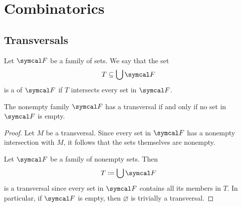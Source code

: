 \section{Combinatorics}\label{sec:combinatorics}
\subsection{Transversals}\label{subsec:transversals}

\begin{definition}\label{def:set_transversal}\cite[89]{Lectures:logic_programming}
  Let \( \Cal{F} \) be a family of sets. We say that the set
  \begin{equation*}
    T \subseteq \bigcup \Cal{F}
  \end{equation*}
  is a  of \( \Cal{F} \) if \( T \) intersects every set in \( \Cal{F} \).
\end{definition}

\begin{proposition}\label{thm:set_transversal_exists}
  The nonempty family \( \Cal{F} \) has a transversal if and only if no set in \( \Cal{F} \) is empty.
\end{proposition}
\begin{proof}
  \Implies Let \( M \) be a transversal. Since every set in \( \Cal{F} \) has a nonempty intersection with \( M \), it follows that the sets themselves are nonempty.

  \ImpliedBy Let \( \Cal{F} \) be a family of nonempty sets. Then
  \begin{equation*}
    T \coloneqq \bigcup \Cal{F}
  \end{equation*}
  is a transversal since every set in \( \Cal{F} \) contains all its members in \( T \). In particular, if \( \Cal{F} \) is empty, then \( \varnothing \) is trivially a transversal.
\end{proof}

